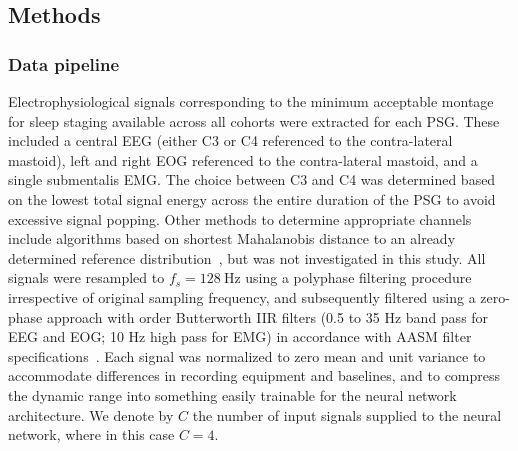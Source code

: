 \subsection{Methods}
\subsubsection{Data pipeline}
Electrophysiological signals corresponding to the minimum acceptable montage for sleep staging available across all cohorts were extracted for each PSG.
These included a central EEG (either C3 or C4 referenced to the contra-lateral mastoid), left and right EOG referenced to the contra-lateral mastoid, and a single submentalis EMG.
The choice between C3 and C4 was determined based on the lowest total signal energy across the entire duration of the PSG to avoid excessive signal popping.
Other methods to determine appropriate channels include algorithms based on shortest Mahalanobis distance to an already determined reference distribution~\cite{Stephansen2018}, but was not investigated in this study.
All signals were resampled to $f_s = \SI{128}{\hertz}$ using a polyphase filtering procedure irrespective of original sampling frequency, and subsequently filtered using a zero-phase approach with  order Butterworth IIR filters (0.5 to 35 Hz band pass for EEG and EOG; 10 Hz high pass for EMG) in accordance with AASM filter specifications~\cite{Berry2020}.
Each signal was normalized to zero mean and unit variance to accommodate differences in recording equipment and baselines, and to compress the dynamic range into something easily trainable for the neural network architecture.
We denote by $C$ the number of input signals supplied to the neural network, where in this case $C=4$.

